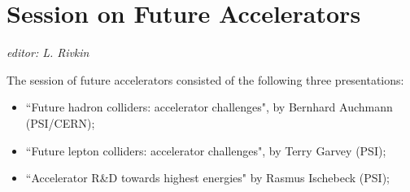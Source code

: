 \section{Session on Future Accelerators}\label{futureacc}{\it editor: L. Rivkin}

\noindent The session of future accelerators consisted of the following three presentations:
\begin{itemize} \setlength{\itemsep}{-1ex}
\item ``Future hadron colliders: accelerator challenges",  by  Bernhard Auchmann  (PSI/CERN); 
\item ``Future lepton colliders: accelerator challenges",  by Terry Garvey   (PSI); 
\item ``Accelerator R\&D towards highest energies" by Rasmus Ischebeck (PSI);  
\end{itemize}




